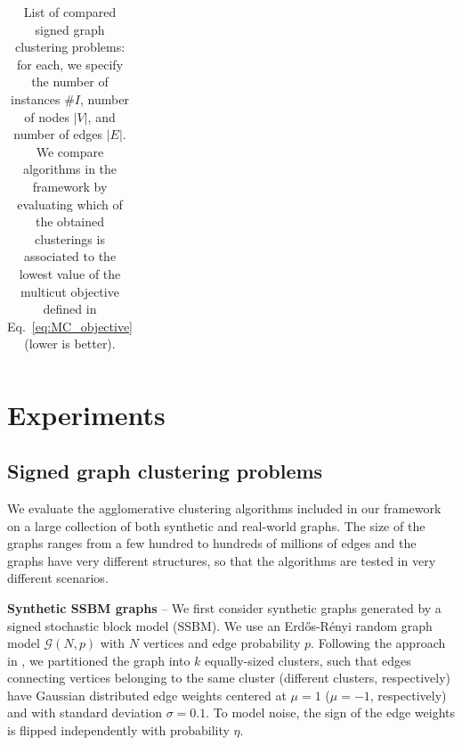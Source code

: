 \begin{table}[t]
\begin{subtable}[t!]{\textwidth}
\begin{tabular}{l  c  r  c  c  | r r r r r r}


        \end{tabular}
    \end{subtable} 
    \caption{List of compared signed graph clustering problems: for each, we specify the number of instances $\# I$, number of nodes $|V|$, and number of edges $|E|$. We compare algorithms in the \algname{} framework by evaluating which of the obtained clusterings is associated to the lowest value of the multicut objective defined in Eq.~\ref{eq:MC_objective} (lower is better).} 
    \label{tab:datasets_and_energies}
\end{table}


\section{Experiments}\label{sec:neuro_segm_exp}
\subsection{Signed graph clustering problems}
We evaluate the agglomerative clustering algorithms included in our framework on a large collection of both synthetic and real-world graphs. The size of the graphs ranges from a few hundred to hundreds of millions of edges and the graphs have very different structures, so that the algorithms are tested in very different scenarios.

\textbf{Synthetic SSBM graphs} -- We first consider synthetic graphs generated by a signed stochastic block model (SSBM). We use an Erd\H os-R\'enyi random graph model $\mathcal{G}(N,p)$ with $N$ vertices and edge probability $p$. Following the approach in \cite{Cucuringu2019SPONGEAG}, we partitioned the graph into $k$ equally-sized clusters, such that edges connecting vertices belonging to the same cluster (different clusters, respectively) have Gaussian distributed edge weights centered at $\mu=1$ ($\mu=-1$, respectively) and with standard deviation $\sigma=0.1$. To model noise, the sign of the edge weights is flipped independently with probability $\eta$.


